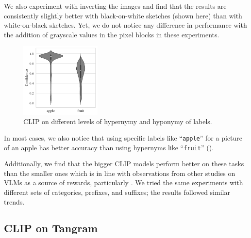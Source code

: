 We also experiment with inverting the images and find that the results are consistently slightly better with black-on-white sketches (shown here) than with white-on-black sketches.
Yet, we do not notice any difference in performance with the addition of grayscale values in the pixel blocks in these experiments.

\newpage
\begin{figure}
    \centering
    \includegraphics[width=0.36\textwidth]{images/hypercategory_comparison_2.pdf}
    \caption{CLIP on different levels of hypernymy and hyponymy of labels.}
    \label{fig:clip-hypercategory}
\end{figure}
In most cases, we also notice that using specific labels like ``\texttt{apple}'' for a picture of an apple has better accuracy than using hypernyms like ``\texttt{fruit}'' ().

Additionally, we find that the bigger CLIP models perform better on these tasks than the smaller ones which is in line with observations from other studies on VLMs as a source of rewards, particularly \cite{vlmrm}.
We tried the same experiments with different sets of categories, prefixes, and suffixes; the results followed similar trends.

\subsection{CLIP on Tangram}
\label{sec:clip-tangram}

